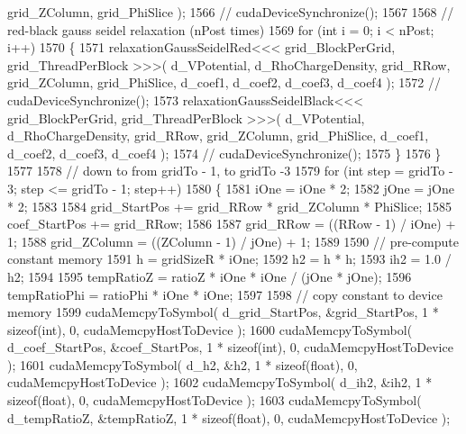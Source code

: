 \begin{DoxyCode}
      grid\_ZColumn, grid\_PhiSlice );
1566 \textcolor{comment}{//          cudaDeviceSynchronize();}
1567 
1568             \textcolor{comment}{// red-black gauss seidel relaxation (nPost times)}
1569             \textcolor{keywordflow}{for} (\textcolor{keywordtype}{int} i = 0; i < nPost; i++)
1570             \{
1571                 relaxationGaussSeidelRed<<< grid\_BlockPerGrid, grid\_ThreadPerBlock >>>( d\_VPotential, 
      d\_RhoChargeDensity, grid\_RRow, grid\_ZColumn, grid\_PhiSlice, d\_coef1, d\_coef2, d\_coef3, d\_coef4 );
1572 \textcolor{comment}{//              cudaDeviceSynchronize();}
1573                 relaxationGaussSeidelBlack<<< grid\_BlockPerGrid, grid\_ThreadPerBlock >>>( d\_VPotential, 
      d\_RhoChargeDensity, grid\_RRow, grid\_ZColumn, grid\_PhiSlice, d\_coef1, d\_coef2, d\_coef3, d\_coef4 );
1574 \textcolor{comment}{//              cudaDeviceSynchronize();}
1575             \}
1576         \}
1577         
1578         \textcolor{comment}{// down to from gridTo - 1, to gridTo -3}
1579         \textcolor{keywordflow}{for} (\textcolor{keywordtype}{int} step = gridTo - 3; step <= gridTo - 1; step++)
1580         \{
1581             iOne = iOne * 2; 
1582             jOne = jOne * 2;
1583 
1584             grid\_StartPos += grid\_RRow * grid\_ZColumn * PhiSlice;
1585             coef\_StartPos += grid\_RRow;
1586 
1587             grid\_RRow       = ((RRow - 1) / iOne) + 1;
1588             grid\_ZColumn    = ((ZColumn - 1) / jOne) + 1;
1589 
1590             \textcolor{comment}{// pre-compute constant memory}
1591             h   = gridSizeR * iOne;
1592             h2  = h * h;
1593             ih2 = 1.0 / h2;
1594 
1595             tempRatioZ = ratioZ * iOne * iOne / (jOne * jOne);
1596             tempRatioPhi = ratioPhi * iOne * iOne;
1597 
1598             \textcolor{comment}{// copy constant to device memory}
1599             cudaMemcpyToSymbol( d\_grid\_StartPos, &grid\_StartPos, 1 * \textcolor{keyword}{sizeof}(\textcolor{keywordtype}{int}), 0, cudaMemcpyHostToDevice
       );
1600             cudaMemcpyToSymbol( d\_coef\_StartPos, &coef\_StartPos, 1 * \textcolor{keyword}{sizeof}(\textcolor{keywordtype}{int}), 0, cudaMemcpyHostToDevice
       );
1601             cudaMemcpyToSymbol( d\_h2, &h2, 1 * \textcolor{keyword}{sizeof}(\textcolor{keywordtype}{float}), 0, cudaMemcpyHostToDevice );
1602             cudaMemcpyToSymbol( d\_ih2, &ih2, 1 * \textcolor{keyword}{sizeof}(\textcolor{keywordtype}{float}), 0, cudaMemcpyHostToDevice );
1603             cudaMemcpyToSymbol( d\_tempRatioZ, &tempRatioZ, 1 * \textcolor{keyword}{sizeof}(\textcolor{keywordtype}{float}), 0, cudaMemcpyHostToDevice );

\end{DoxyCode}
